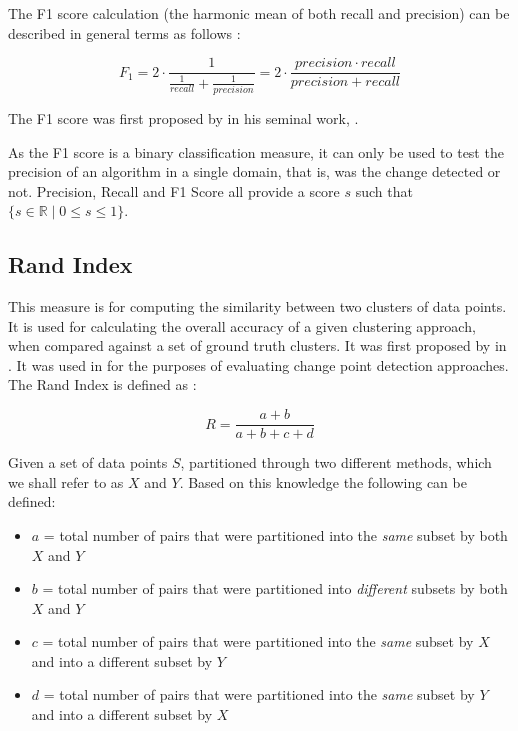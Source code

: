 \documentclass{uvamscse}	%
\begin{document}
	The F1 score calculation (the harmonic mean of both recall and precision) can be described in general terms as follows \cite{VanRijsbergen1979}:

	\begin{equation}
		F_1 = 2 \cdot \frac{1}{\frac{1}{recall} + \frac{1}{precision}} = 2 \cdot \frac{precision \cdot recall}{precision+recall}
		\label{equ:F1}
	\end{equation}

    The F1 score was first proposed by \citeauthor{VanRijsbergen1979} in his seminal work, .

	As the F1 score is a binary classification measure, it can only be used to test the precision of an algorithm in a single domain, that is, was the change detected or not. Precision, Recall and F1 Score all provide a score $s$ such that $ \{s\in\mathbb{R} \mid 0\leq s \leq 1\} $.

\subsection{Rand Index}

This measure is for computing the similarity between two clusters of data points. It is used for calculating the overall accuracy of a given clustering approach, when compared against a set of ground truth clusters. It was first proposed by \citeauthor{Rand1971} in . It was used in \cite{Matteson2012} for the purposes of evaluating change point detection approaches. The Rand Index is defined as \cite{Rand1971}:

	\begin{equation}
		R = \frac{a+b}{a+b+c+d}
	\end{equation}
	
	Given a set of data points $S$, partitioned through two different methods, which we shall refer to as $X$ and $Y$. Based on this knowledge the following can be defined:
	
	\begin{itemize}
		\item $a$ = total number of pairs that were partitioned into the \emph{same} subset by both $X$ and $Y$
		\item $b$ = total number of pairs that were partitioned into \emph{different} subsets by both $X$ and $Y$
		\item $c$ = total number of pairs that were partitioned into the \emph{same} subset by $X$ and into a different subset by $Y$
		\item $d$ = total number of pairs that were partitioned into the \emph{same} subset by $Y$ and into a different subset by $X$
	\end{itemize}
	
\end{document}
